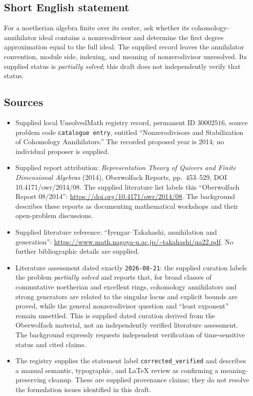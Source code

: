 \documentclass[11pt]{article}
\begin{document}
\subsection{Short English statement}
For a noetherian algebra finite over its center, ask whether its cohomology-annihilator ideal contains a nonzerodivisor and determine the first degree approximation equal to the full ideal. The supplied record leaves the annihilator convention, module side, indexing, and meaning of nonzerodivisor unresolved. Its supplied status is \emph{partially solved}; this draft does not independently verify that status.
\subsection{Sources}
\begin{itemize}
\item Supplied local UnsolvedMath registry record, permanent ID \(30002516\), source problem code \texttt{catalogue entry}, entitled ``Nonzerodivisors and Stabilization of Cohomology Annihilators.'' The recorded proposed year is 2014; no individual proposer is supplied.
\item Supplied report attribution: \emph{Representation Theory of Quivers and Finite Dimensional Algebras} (2014), Oberwolfach Reports, pp.\ 453--529, DOI 10.4171/owr/2014/08. The supplied literature list labels this ``Oberwolfach Report 08/2014'': \url{https://doi.org/10.4171/owr/2014/08}. The background describes these reports as documenting mathematical workshops and their open-problem discussions.
\item Supplied literature reference: ``Iyengar--Takahashi, annihilation and generation'': \url{https://www.math.nagoya-u.ac.jp/~takahashi/ua22.pdf}. No further bibliographic details are supplied.
\item Literature assessment dated exactly \texttt{2026-08-21}: the supplied curation labels the problem \emph{partially solved} and reports that, for broad classes of commutative noetherian and excellent rings, cohomology annihilators and strong generators are related to the singular locus and explicit bounds are proved, while the general nonzerodivisor question and ``least exponent'' remain unsettled. This is supplied dated curation derived from the Oberwolfach material, not an independently verified literature assessment. The background expressly requests independent verification of time-sensitive status and cited claims.
\item The registry supplies the statement label \texttt{corrected\_verified} and describes a manual semantic, typographic, and LaTeX review as confirming a meaning-preserving cleanup. These are supplied provenance claims; they do not resolve the formulation issues identified in this draft.
\end{itemize}
\end{document}
